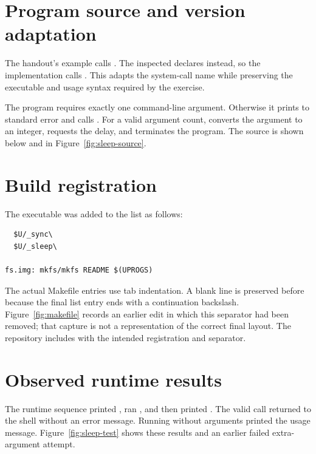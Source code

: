 \documentclass{../latex/utmreport}
\begin{document}
\section{Program source and version adaptation}
The handout's example calls . The inspected
 declares  instead, so the implementation
calls . This adapts the system-call name while
preserving the executable and usage syntax required by the exercise.

The program requires exactly one command-line argument. Otherwise it prints
 to standard error and calls .
For a valid argument count,  converts the argument to an integer,
 requests the delay, and  terminates the program.
The source is shown below and in Figure~\ref{fig:sleep-source}.


\section{Build registration}
The executable was added to the  list as follows:
\begin{lstlisting}
  $U/_sync\
  $U/_sleep\

fs.img: mkfs/mkfs README $(UPROGS)
\end{lstlisting}
The actual Makefile entries use tab indentation. A blank line is preserved
before \code{fs.img:} because the final list entry ends with a continuation
backslash. Figure~\ref{fig:makefile} records an earlier edit in which this
separator had been removed; that capture is not a representation of the
correct final layout. The repository includes \code{Makefile.patch} with
the intended registration and separator.

\section{Observed runtime results}
The runtime sequence printed , ran , and then
printed \code{after}. The valid call returned to the shell without an error
message. Running \code{sleep} without arguments printed the usage message.
Figure~\ref{fig:sleep-test} shows these results and an earlier failed
extra-argument attempt.
\end{document}

